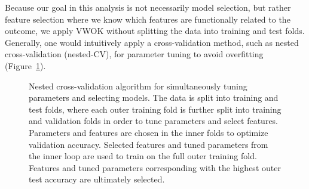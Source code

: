 \documentclass[10pt,letterpaper]{article}
\begin{document}

Because our goal in this analysis is not necessarily model selection, but rather feature selection where we know which features are functionally related to the outcome, we apply VWOK without splitting the data into training and test folds. Generally, one would intuitively apply a cross-validation method, such as nested cross-validation (nested-CV), for parameter tuning to avoid overfitting (Figure~\ref{fig:nCV}). 

\begin{figure}[!bht]
	\centering
	\caption{Nested cross-validation algorithm for simultaneously tuning parameters and selecting models. The data is split into training and test folds, where each outer training fold is further split into training and validation folds in order to tune parameters and select features. Parameters and features are chosen in the inner folds to optimize validation accuracy. Selected features and tuned parameters from the inner loop are used to train on the full outer training fold. Features and tuned parameters corresponding with the highest outer test accuracy are ultimately selected.}\label{fig:nCV}
\end{figure}
\end{document}
